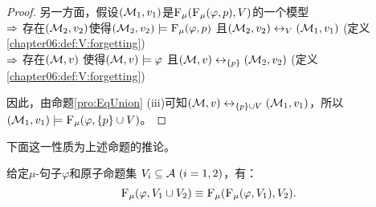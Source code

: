 \begin{proof}
	另一方面，假设$({\cal M}_1,v_1)$是${\textsc{F}_{\textsc{$\mu$}}}({\textsc{F}_{\textsc{$\mu$}}}(\varphi, p), V)$的一个模型\\
	$\Rightarrow$ 存在$({\cal M}_2,v_2)$使得$({\cal M}_2,v_2) \models  {\textsc{F}_{\textsc{$\mu$}}}(\varphi, p)$ 且$({\cal M}_2,v_2) \leftrightarrow_V ({\cal M}_1,v_1)$ \hfill(定义\ref{chapter06:def:V:forgetting})\\
	$\Rightarrow$ 存在$({\cal M},v)$ 使得$({\cal M},v) \models \varphi$ 且$({\cal M},v) \leftrightarrow_{\{p\}} ({\cal M}_2,v_2)$ \hfill(定义\ref{chapter06:def:V:forgetting}) 
	
	因此，由命题\ref{pro:EqUnion} (iii)可知$({\cal M},v) \leftrightarrow_{\{p\} \cup V} ({\cal M}_1,v_1)$，所以$({\cal M}_1,v_1) \models {\textsc{F}_{\textsc{$\mu$}}}(\varphi, \{p\} \cup V)$。
\end{proof}


下面这一性质为上述命题的推论。

\begin{corollary}[切片性]\label{chapter06:disTFV}
	给定$\mu$-句子$\varphi$和原子命题集 $V_i\subseteq{\cal A}~(i=1,2)$，有：
	\[
	{\textsc{F}_{\textsc{$\mu$}}}(\varphi, V_1 \cup V_2) \equiv {\textsc{F}_{\textsc{$\mu$}}}({\textsc{F}_{\textsc{$\mu$}}}(\varphi, V_1), V_2).
	\]
\end{corollary}

